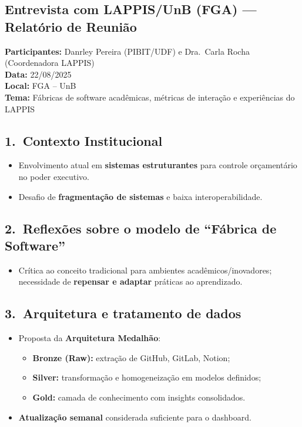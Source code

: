 \documentclass[
	12pt,
	openright,
	oneside,
	a4paper,
	brazil
]{abntex2}
\begin{document}
\begin{apendicesenv}
\partapendices

\chapter{Entrevista com LAPPIS/UnB (FGA) --- Relatório de Reunião}
\label{apendiceA}

\textbf{Participantes:} Danrley Pereira (PIBIT/UDF) e Dra.\ Carla Rocha (Coordenadora LAPPIS) \\
\textbf{Data:} 22/08/2025 \\
\textbf{Local:} FGA -- UnB \\
\textbf{Tema:} Fábricas de software acadêmicas, métricas de interação e experiências do LAPPIS

\section*{1.\ Contexto Institucional}
\begin{itemize}
\item Envolvimento atual em \textbf{sistemas estruturantes} para controle orçamentário no poder executivo.
\item Desafio de \textbf{fragmentação de sistemas} e baixa interoperabilidade.
\end{itemize}

\section*{2.\ Reflexões sobre o modelo de ``Fábrica de Software''}
\begin{itemize}
\item Crítica ao conceito tradicional para ambientes acadêmicos/inovadores; necessidade de \textbf{repensar e adaptar} práticas ao aprendizado.
\end{itemize}

\section*{3.\ Arquitetura e tratamento de dados}
\begin{itemize}
\item Proposta da \textbf{Arquitetura Medalhão}:
\begin{itemize}
\item \textbf{Bronze (Raw):} extração de GitHub, GitLab, Notion;
\item \textbf{Silver:} transformação e homogeneização em modelos definidos;
\item \textbf{Gold:} camada de conhecimento com insights consolidados.
\end{itemize}
\item \textbf{Atualização semanal} considerada suficiente para o dashboard.
\end{itemize}


\end{apendicesenv}
\end{document}
